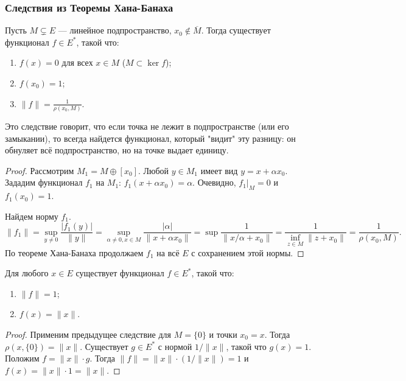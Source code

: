 \subsubsection*{Следствия из Теоремы Хана-Банаха}

\begin{corollary}\label{cor:HB_sep}
	Пусть $M \subsetneq E$ --- линейное подпространство, $x_0 \notin \overline{M}$.
	Тогда существует функционал $f \in E^*$, такой что:
	\begin{enumerate}
		\item $f(x) = 0$ для всех $x \in M$ ($M \subset \ker f$);
		\item $f(x_0) = 1$;
		\item $\|f\| = \frac{1}{\rho(x_0, M)}$.
	\end{enumerate}
\end{corollary}

\begin{idea}
	Это следствие говорит, что если точка не лежит в подпространстве (или его замыкании), то всегда найдется функционал, который "видит" эту разницу: он обнуляет всё подпространство, но на точке выдает единицу.
\end{idea}


\begin{proof}
	Рассмотрим $M_1 = M \oplus [x_0]$. Любой $y \in M_1$ имеет вид $y = x + \alpha x_0$.
	Зададим функционал $f_1$ на $M_1$: $f_1(x + \alpha x_0) = \alpha$.
	Очевидно, $f_1|_M = 0$ и $f_1(x_0) = 1$.
	
	Найдем норму $f_1$.
	\[ \|f_1\| = \sup_{y \neq 0} \frac{|f_1(y)|}{\|y\|} = \sup_{\alpha \neq 0, x \in M} \frac{|\alpha|}{\|x + \alpha x_0\|} = \sup \frac{1}{\|x/\alpha + x_0\|} = \frac{1}{\inf_{z \in M} \|z + x_0\|} = \frac{1}{\rho(x_0, M)}. \]
	По теореме Хана-Банаха продолжаем $f_1$ на всё $E$ с сохранением этой нормы.
\end{proof}

\begin{corollary}\label{cor:HB_norm}
	Для любого $x \in E$ существует функционал $f \in E^*$, такой что:
	\begin{enumerate}
		\item $\|f\| = 1$;
		\item $f(x) = \|x\|$.
	\end{enumerate}
\end{corollary}

\begin{proof}
	Применим предыдущее следствие для $M = \{0\}$ и точки $x_0 = x$.
	Тогда $\rho(x, \{0\}) = \|x\|$.
	Существует $g \in E^*$ с нормой $1/\|x\|$, такой что $g(x) = 1$.
	Положим $f = \|x\| \cdot g$. Тогда $\|f\| = \|x\| \cdot (1/\|x\|) = 1$ и $f(x) = \|x\| \cdot 1 = \|x\|$.
\end{proof}

